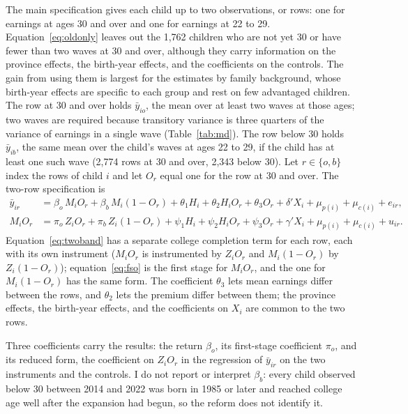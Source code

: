 \documentclass[11pt]{article}
\begin{document}
The main specification gives each child up to two observations, or rows: one for earnings at ages 30 and over and one for earnings at 22 to 29. Equation~\eqref{eq:oldonly} leaves out the 1,762 children who are not yet 30 or have fewer than two waves at 30 and over, although they carry information on the province effects, the birth-year effects, and the coefficients on the controls. The gain from using them is largest for the estimates by family background, whose birth-year effects are specific to each group and rest on few advantaged children. The row at 30 and over holds $\bar y_{io}$, the mean over at least two waves at those ages; two waves are required because transitory variance is three quarters of the variance of earnings in a single wave (Table~\ref{tab:md}). The row below 30 holds $\bar y_{ib}$, the same mean over the child's waves at ages 22 to 29, if the child has at least one such wave (2,774 rows at 30 and over, 2,343 below 30). Let $r \in \{o, b\}$ index the rows of child $i$ and let $O_r$
equal one for the row at 30 and over. The two-row specification is
\begin{align}
\bar y_{ir} &= \beta_o\, M_i O_r + \beta_b\, M_i (1 - O_r) + \theta_1 H_i
+ \theta_2 H_i O_r + \theta_3 O_r + \delta' X_i + \mu_{p(i)} + \mu_{c(i)} +
e_{ir}, \label{eq:twoband} \\
M_i O_r &= \pi_o\, Z_i O_r + \pi_{b}\, Z_i (1 - O_r) + \psi_1 H_i
+ \psi_2 H_i O_r + \psi_3 O_r + \gamma' X_i + \mu_{p(i)} + \mu_{c(i)} +
u_{ir}. \label{eq:fso}
\end{align}
Equation~\eqref{eq:twoband} has a separate college completion term for each row, each with its own instrument ($M_i O_r$ is instrumented by $Z_i O_r$ and $M_i (1 - O_r)$ by $Z_i (1 - O_r)$); equation~\eqref{eq:fso} is the first stage for $M_i O_r$, and the one for $M_i (1 - O_r)$ has the same form. The coefficient $\theta_3$ lets mean earnings differ between the rows, and $\theta_2$ lets the premium differ between them; the province effects, the birth-year effects, and the coefficients on $X_i$ are common to the two rows.

Three coefficients carry the results: the return $\beta_o$, its first-stage coefficient $\pi_o$, and its reduced form, the coefficient on $Z_i O_r$ in the regression of $\bar y_{ir}$ on the two instruments and the controls. I do not report or interpret $\beta_b$: every child observed below 30 between 2014 and 2022 was born in
1985 or later and reached college age well after the expansion had begun, so the reform does not identify it.
\end{document}
